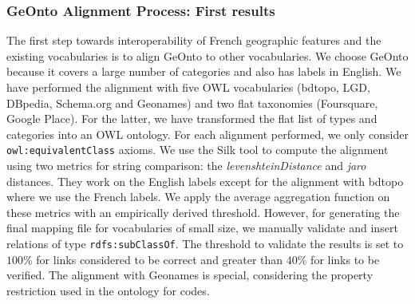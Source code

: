\subsubsection{GeOnto Alignment Process: First results}
The first step towards interoperability of French geographic features and the existing vocabularies is to align GeOnto to other vocabularies. We choose GeOnto because it covers a large number of categories and also has labels in English. We have performed the alignment with five OWL vocabularies (bdtopo, LGD, DBpedia, Schema.org and Geonames) and two flat taxonomies (Foursquare, Google Place). For the latter, we have transformed the flat list of types and categories into an OWL ontology. For each alignment performed, we only consider \texttt{owl:equivalentClass} axioms. We use the Silk tool \cite{Julius09} to compute the alignment using two metrics for string comparison: the \textit{levenshteinDistance} and \textit{jaro} distances. They work on the English labels except for the alignment with bdtopo where we use the French labels. We apply the average aggregation function on these metrics with an empirically derived threshold. However, for generating the final mapping file for vocabularies of small size, we manually validate and insert relations of type \texttt{rdfs:subClassOf}. The threshold to validate the results is set to $100$\% for links considered to be correct and greater than $40$\% for links to be verified. The alignment with Geonames is special, considering the property restriction used in the ontology for codes.

